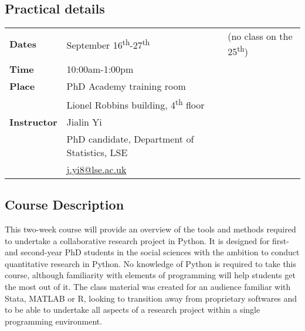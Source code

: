 \documentclass{article}
\numberwithin{equation}{section}
\begin{document}

\subsection*{Practical details}

\vspace{0.5cm}

\begin{tabular}{lll}
    \textbf{Dates} &  September 16\textsuperscript{th}-27\textsuperscript{th} & (no class on the 25\textsuperscript{th})\\
    \textbf{Time} &  10:00am-1:00pm & \\
    \textbf{Place} & PhD Academy training room & \\
        & Lionel Robbins building, 4\textsuperscript{th} floor & \\
    \textbf{Instructor} & Jialin Yi & \\
     & PhD candidate, Department of Statistics, LSE & \\
     & \href{
mailto:j.yi8@lse.ac.uk}{j.yi8@lse.ac.uk} & \\
\end{tabular}

\vspace{0.5cm}

\subsection*{Course Description}

\vspace{0.5cm}

This two-week course will provide an overview of the tools and methods required to undertake a collaborative research project in Python. It is designed for first- and second-year PhD students in the social sciences with the ambition to conduct quantitative research in Python. No knowledge of Python is required to take this course, although familiarity with elements of programming will help students get the most out of it. The class material was created for an audience familiar with Stata, MATLAB or R, looking to transition away from proprietary softwares and to be able to undertake all aspects of a research project within a single programming environment. \\
\end{document}
